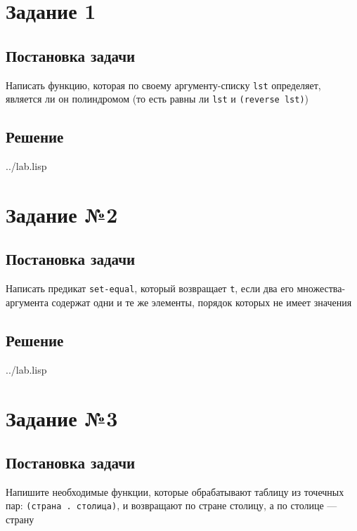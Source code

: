 \section*{Задание 1}
\subsection*{Постановка задачи}
Написать функцию, которая по своему аргументу-списку \texttt{lst} определяет, является ли он полиндромом (то есть равны ли \texttt{lst} и \texttt{(reverse lst)})

\subsection*{Решение}
\begin{lstinputlisting}[label=third,caption=Решение задания №1, language=lisp, firstline=2, lastline=6]{../lab.lisp}
	
\end{lstinputlisting}


\section*{Задание №2}
\subsection*{Постановка задачи}
Написать предикат \texttt{set-equal}, который возвращает \texttt{t}, если два его множества-аргумента содержат одни и те же элементы, порядок которых не имеет значения

\subsection*{Решение}
\begin{lstinputlisting}[label=third,caption=Решение задания №2, language=lisp, firstline=12, lastline=19]{../lab.lisp}
	
\end{lstinputlisting}


\section*{Задание №3}
\subsection*{Постановка задачи}
Напишите необходимые функции, которые обрабатывают таблицу из точечных пар: \texttt{(страна . столица)}, и возвращают по стране столицу, а по столице --- страну

